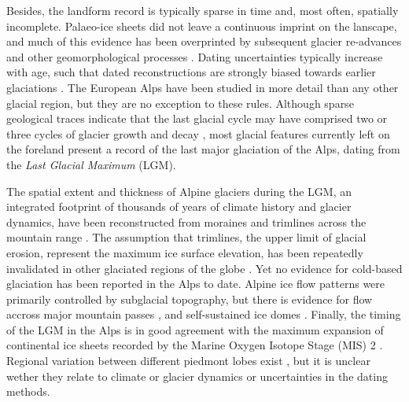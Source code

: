 \documentclass[tc, manuscript]{copernicus}
\begin{document}
    Besides, the landform record is typically sparse in time and, most often,
    spatially incomplete. Palaeo-ice sheets did not leave a continuous imprint
    on the lanscape, and much of this evidence has been overprinted by
    subsequent glacier re-advances and other geomorphological processes
    \citep[e.g.,][]{Kleman.1994, Kleman.etal.2006, Kleman.etal.2010}. Dating
    uncertainties typically increase with age, such that dated reconstructions
    are strongly biased towards earlier glaciations \citep{Heyman.etal.2011}.
    The European Alps have been studied in more detail than any other glacial
    region, but they are no exception to these rules. Although sparse
    geological traces indicate that the last glacial cycle may have comprised
    two or three cycles of glacier growth and decay \citep{Preusser.2004,
    Ivy-Ochs.etal.2008}, most glacial features currently left on the foreland
    present a record of the last major glaciation of the Alps, dating from the
    \emph{Last Glacial Maximum} (LGM).

    The spatial extent and thickness of Alpine glaciers during the LGM, an
    integrated footprint of thousands of years of climate history and glacier
    dynamics, have been reconstructed from moraines and trimlines across the
    mountain range \citep[e.g.,][]{Bini.etal.2009, Coutterand.2010,
    Husen.2011}. The assumption that trimlines, the upper limit of glacial
    erosion, represent the maximum ice surface elevation, has
    been repeatedly invalidated in other glaciated regions of the globe
    \citep[e.g.,][]{Kleman.1994, Kleman.etal.2010, Fabel.etal.2012}. Yet no
    evidence for cold-based glaciation has been reported in the Alps to date.
    Alpine ice flow
    patterns were primarily controlled by subglacial topography, but there is
    evidence for flow accross major mountain passes
    \citep[e.g.,][]{Coutterand.2010, Kelly.etal.2004, Husen.2011}, and
    self-sustained ice domes \citep{Bini.etal.2009}. Finally, the timing of the
    LGM in the Alps \citep{Ivy-Ochs.etal.2008, Monegato.etal.2017} is in good
    agreement with the maximum expansion of continental ice sheets recorded by
    the Marine Oxygen Isotope Stage (MIS) 2
    \citep[29--14\,ka;][]{Lisiecki.Raymo.2005}. Regional variation between
    different piedmont
    lobes exist \citep[Fig.~5]{Wirsig.etal.2016}, but it is unclear wether they
    relate to climate or glacier dynamics \citep{Monegato.etal.2017} or
    uncertainties in the dating methods.
\end{document}
